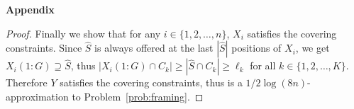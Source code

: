 \documentclass[msom,non-blindrev]{informs3} %
\theoremstyle{definition}
\begin{document}
\begin{appendices}{\Large \noindent\textbf{Appendix}}
{\begin{proof}
Finally we show that for any $i\in\{1,2,\dots,n\}$, $X_i$ satisfies the covering constraints. Since $\hat{S}$ is always offered at the last $|\hat{S}|$ positions of $X_i$, we get $X_i(1:G)\supseteq \hat{S}$, thus $|X_i(1:G)\cap C_k|\geq |\hat{S}\cap C_k|\geq \ell_k$ for all $k\in\{1,2,\dots,K\}$. Therefore $Y$ satisfies the covering constraints, thus is a $1/2\log(8n)$-approximation to Problem~\eqref{prob:framing}.
\end{proof}

}

\end{appendices}
\end{document}
